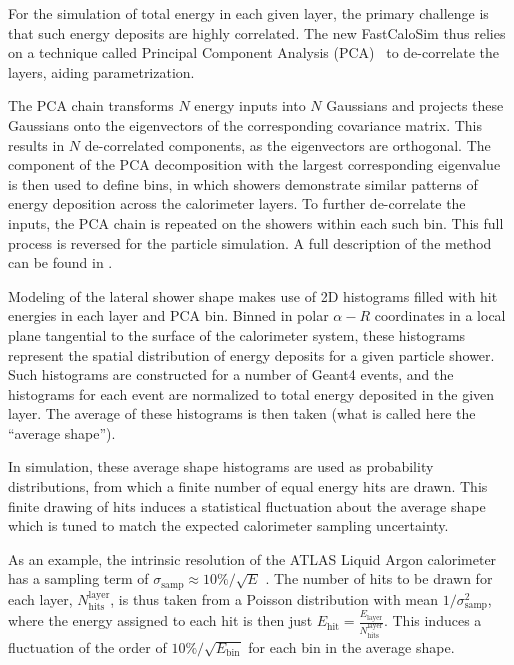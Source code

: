 For the simulation of total energy in each given layer, the primary challenge is that such energy deposits are highly correlated. The new FastCaloSim thus relies on a technique called Principal Component Analysis (PCA)~\cite{TPrincipal} to de-correlate the layers, aiding parametrization.

The PCA chain transforms $N$ energy inputs into $N$ Gaussians and projects these Gaussians onto the eigenvectors of the corresponding covariance matrix. This results in $N$ de-correlated components, as the eigenvectors are orthogonal. The component of the PCA decomposition with the largest corresponding eigenvalue is then used to define bins, in which showers demonstrate similar patterns of energy deposition across the calorimeter layers. To further de-correlate the inputs, the PCA chain is repeated on the showers within each such bin. This full process is reversed for the particle simulation. A full description of the method can be found in \cite{ATL-SOFT-PUB-2018-002}.

Modeling of the lateral shower shape makes use of 2D histograms filled with \GEANT hit energies in each layer and PCA bin.
Binned in polar $\alpha-R$ coordinates in a local plane tangential to the surface of the calorimeter system, these histograms 
represent the spatial distribution of energy deposits for a given particle shower. Such histograms are constructed for a 
number of Geant4 events, and the histograms for each event are normalized to total energy deposited in the given layer. The 
average of these histograms is then taken (what is called here the ``average shape'').

In simulation, these average shape histograms are used as probability distributions, from which a finite number of equal 
energy hits are drawn. This finite drawing of hits induces a statistical fluctuation about the average shape which is tuned 
to match the expected calorimeter sampling uncertainty.

As an example, the intrinsic resolution of the ATLAS Liquid Argon calorimeter has a sampling term of 
$\sigma_{\text{samp}} \approx 10\%/\sqrt{E}$ \cite{SamplingCalo}. The number of hits to be drawn for each layer, 
$N_{\text{hits}}^{\text{layer}}$, is thus taken from a Poisson distribution with mean $1/\sigma_{\text{samp}}^2$, where the 
energy assigned to each hit is then just $E_{\text{hit}} = \frac{E_{\text{layer}}}{N_{\text{hits}}^{\text{layer}}}$. This 
induces a fluctuation of the order of $10\%/\sqrt{E_{\text{bin}}}$ for each bin in the average shape.

